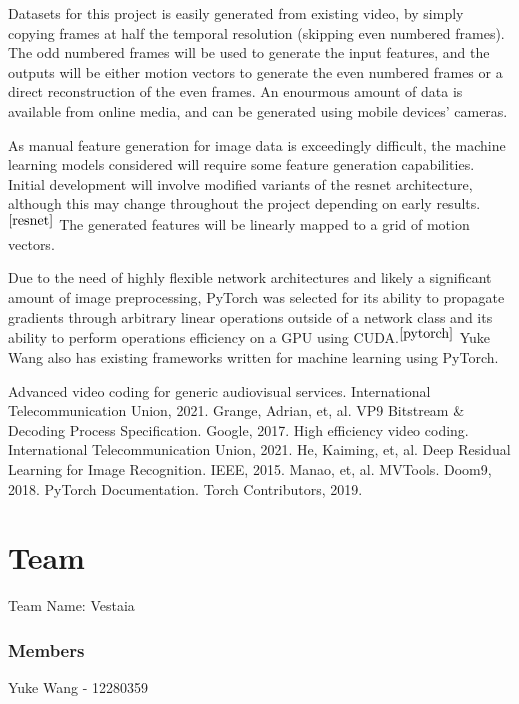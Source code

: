 \documentclass[twocolumn]{paper}
\begin{document}
Datasets for this project is easily generated from existing video, by simply copying frames at half the temporal resolution (skipping even numbered frames). The odd numbered frames will be used to generate the input features, and the outputs will be either motion vectors to generate the even numbered frames or a direct reconstruction of the even frames. An enourmous amount of data is available from online media, and can be generated using mobile devices' cameras.

As manual feature generation for image data is exceedingly difficult, the machine learning models considered will require some feature generation capabilities. Initial development will involve modified variants of the resnet architecture, although this may change throughout the project depending on early results.$^{\cite{resnet}}$ The generated features will be linearly mapped to a grid of motion vectors.

Due to the need of highly flexible network architectures and likely a significant amount of image preprocessing, PyTorch was selected for its ability to propagate gradients through arbitrary linear operations outside of a network class and its ability to perform operations efficiency on a GPU using CUDA.$^{\cite{pytorch}}$ Yuke Wang also has existing frameworks written for machine learning using PyTorch.

\begin{thebibliography}{9}

  Advanced video coding for generic audiovisual services. International Telecommunication Union, 2021.
  Grange, Adrian, et, al. VP9 Bitstream \& Decoding Process Specification. Google, 2017.
  High efficiency video coding. International Telecommunication Union, 2021.
  He, Kaiming, et, al. Deep Residual Learning for Image Recognition. IEEE, 2015.
  Manao, et, al. MVTools. Doom9, 2018.
  PyTorch Documentation. Torch Contributors, 2019.
\end{thebibliography}

\section*{Team}
Team Name: Vestaia
\subsubsection*{Members}
Yuke Wang - 12280359
\end{document}
